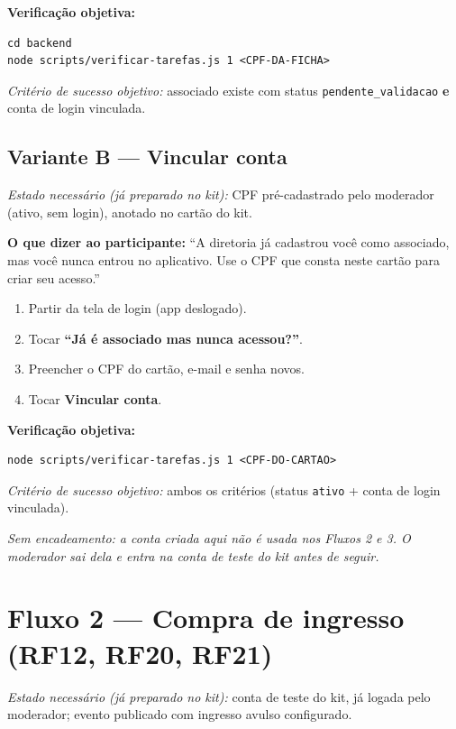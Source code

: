 \documentclass[11pt,a4paper]{article}
\newcommand{\dizer}[1]{%
  \noindent\colorbox{lightbg}{%
    \begin{minipage}{0.95\linewidth}
    \vspace{1mm}
    \textbf{O que dizer ao participante:} ``#1''
    \vspace{1mm}
    \end{minipage}%
  }\vspace{3mm}
}
\newcommand{\criterio}[1]{%
  \noindent\textit{Critério de sucesso objetivo:} #1
}
\newcommand{\estado}[1]{%
  \noindent\textit{Estado necessário (já preparado no kit):} #1
  \vspace{2mm}
}
\begin{document}
\textbf{Verificação objetiva:}
\begin{verbatim}
cd backend
node scripts/verificar-tarefas.js 1 <CPF-DA-FICHA>
\end{verbatim}
\criterio{associado existe com status \texttt{pendente\_validacao} \textbf{e} conta de login
vinculada.}

\subsection*{Variante B --- Vincular conta}

\estado{CPF pré-cadastrado pelo moderador (ativo, sem login), anotado no cartão do kit.}

\dizer{A diretoria já cadastrou você como associado, mas você nunca entrou no aplicativo. Use o
CPF que consta neste cartão para criar seu acesso.}

\begin{enumerate}[leftmargin=6mm]
  \item Partir da tela de login (app deslogado).
  \item Tocar \textbf{``Já é associado mas nunca acessou?''}.
  \item Preencher o CPF do cartão, e-mail e senha novos.
  \item Tocar \textbf{Vincular conta}.
\end{enumerate}

\textbf{Verificação objetiva:}
\begin{verbatim}
node scripts/verificar-tarefas.js 1 <CPF-DO-CARTAO>
\end{verbatim}
\criterio{ambos os critérios (status \texttt{ativo} + conta de login vinculada).}

\vspace{1mm}
\noindent\textit{Sem encadeamento: a conta criada aqui não é usada nos Fluxos 2 e 3. O moderador
sai dela e entra na conta de teste do kit antes de seguir.}

\section*{Fluxo 2 --- Compra de ingresso (RF12, RF20, RF21)}

\estado{conta de teste do kit, já logada pelo moderador; evento publicado com ingresso avulso
configurado.}
\end{document}
